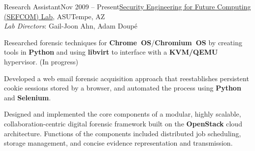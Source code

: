 
\def\PositionTitle{Research Assistant}
\def\PositionPeriod{Nov 2009 -- Present}
\def\OrgName{\href{http://sefcom.asu.edu/}{Security Engineering for Future Computing (SEFCOM) Lab}, ASU}
\def\OrgLocation{Tempe, AZ}


\begin{rExperience}{\PositionTitle}{\PositionPeriod}{\OrgName}{\OrgLocation\\
  {\textnormal{\textit{Lab Directors}: Gail-Joon Ahn, Adam Doup\'{e}%
  }}}




        \item Researched forensic techniques for \textbf{Chrome~OS}/\textbf{Chromium~OS} by creating tools in \textbf{Python} and using \textbf{libvirt} to interface with a \textbf{KVM/QEMU} hypervisor. (In progress)

        \item Developed a web email forensic acquisition approach that reestablishes persistent cookie sessions stored by a browser, and automated the process using \textbf{Python} and \textbf{Selenium}.

        \item Designed and implemented the core components of a modular, highly scalable, collaboration-centric digital forensic framework built on the \textbf{OpenStack} cloud architecture. Functions of the components included distributed job scheduling, storage management, and concise evidence representation and transmission.



\end{rExperience}
